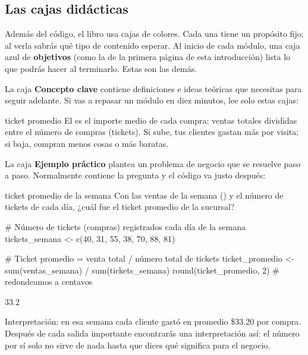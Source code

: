 \subsection{Las cajas didácticas}

Además del código, el libro usa cajas de colores. Cada una tiene un
propósito fijo; al verla sabrás qué tipo de contenido esperar. Al inicio de
cada módulo, una caja azul de \textbf{objetivos} (como la de la primera
página de esta introducción) lista lo que podrás hacer al terminarlo. Estas
son las demás.

La caja \textbf{Concepto clave} contiene definiciones e ideas teóricas que
necesitas para seguir adelante. Si vas a repasar un módulo en diez minutos,
lee solo estas cajas:

\begin{concepto}{ticket promedio}
El  es el importe medio de cada compra:
ventas totales divididas entre el número de compras (tickets). Si sube, tus
clientes gastan más por visita; si baja, compran menos cosas o más baratas.
\end{concepto}

La caja \textbf{Ejemplo práctico} plantea un problema de negocio que se
resuelve paso a paso. Normalmente contiene la pregunta y el código va justo
después:

\begin{ejemplo}{ticket promedio de la semana}
Con las ventas de la semana () y el número de
tickets de cada día, ¿cuál fue el ticket promedio de la sucursal?
\end{ejemplo}

\begin{rcode}
# Número de tickets (compras) registrados cada día de la semana
tickets_semana <- c(40, 31, 55, 38, 70, 88, 81)

# Ticket promedio = venta total / número total de tickets
ticket_promedio <- sum(ventas_semana) / sum(tickets_semana)
round(ticket_promedio, 2)   # redondeamos a centavos
\end{rcode}

\begin{rsalida}
[1] 33.2
\end{rsalida}

Interpretación: en esa semana cada cliente gastó en promedio \$33.20 por
compra. Después de cada salida importante encontrarás una interpretación
así: el número por sí solo no sirve de nada hasta que dices qué significa
para el negocio.

